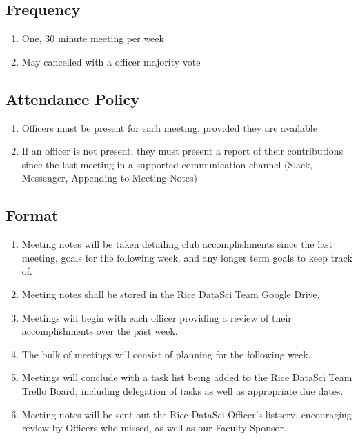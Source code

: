 \documentclass[12pt]{article}
\begin{document}
\subsection{Frequency}

\begin{enumerate}
  \item One, 30 minute meeting per week
    
  \item May cancelled with a  officer majority vote
\end{enumerate}

\subsection{Attendance Policy}

\begin{enumerate}
  \item Officers must be present for each meeting, provided they are available

  \item If an officer is not present, they must present a report of their
    contributions since the last meeting in a supported communication channel
    (Slack, Messenger, Appending to Meeting Notes)
\end{enumerate}

\subsection{Format}

\begin{enumerate}
  \item Meeting notes will be taken detailing club accomplishments since the
    last meeting, goals for the following week, and any longer term goals to
    keep track of.

  \item Meeting notes shall be stored in the Rice DataSci Team Google Drive.

  \item Meetings will begin with each officer providing a review of their
    accomplishments over the past week.

  \item The bulk of meetings will consist of planning for the following week.
    
  \item Meetings will conclude with a task list being added to the Rice DataSci
    Team Trello Board, including delegation of tasks as well as appropriate due
    dates.

  \item Meeting notes will be sent out the Rice DataSci Officer's listserv, 
    encouraging review by Officers who missed, as well as our Faculty Sponsor.
\end{enumerate}
\end{document}
